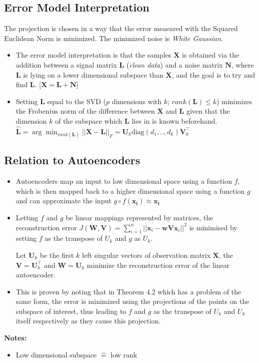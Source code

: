 \documentclass[english]{latex4ei/latex4ei_sheet}
\begin{document}
\begin{sectionbox}
\subsection{Error Model Interpretation}
The projection is chosen in a way that the error measured with the Squared Euclidean Norm is minimized. The minimized noise is \emph{White Gaussian}.
\begin{itemize}
\item The error model interpretation is that the samples $\mathbf{X}$ is obtained via the addition between a signal matrix $\mathbf{L}$ (\emph{clean data}) and a noise matrix $\mathbf{N}$, where $\mathbf{L}$ is lying on a lower dimensional subspace than $\mathbf{X}$, and the goal is to try and find $\mathbf{L}$.
[$\mathbf{X}=\mathbf{L}+\mathbf{N}$]
\item Setting $\mathbf{L}$ equal to the SVD ($p$ dimensions with $k$; $rank(\mathbf{L})\le k$) minimizes the Frobenius norm of the difference between $\mathbf{X}$ and $\mathbf{L}$ given that the dimension $k$ of the subspace which $\mathbf{L}$ lies in is known beforehand. \\
$ \hat{\mathbf{L}}=\arg\min_{rank(\mathbf{L})}||\mathbf{X}-\mathbf{L}||_F=\mathbf{U}_k\mathrm{diag}(d_1,..,d_k)\mathbf{V}_k^{\top}$
\end{itemize}

\subsection{Relation to Autoencoders}
\begin{itemize}
    \item Autoencoders map an input to low dimensional space using a function $f$, which is then mapped back to a higher dimensional space using a function $g$ and can approximate the input $g\circ f(\mathbf{x_i})\approx\mathbf{x_i}$
\item Letting $f$ and $g$ be linear mappings represented by matrices, the reconstruction error $J(\mathbf{W,V})=\sum_{i=1}^n||\mathbf{x}_i-\mathbf{wVx}_i||^2$ is minimised by setting $f$ as the transpose of $U_k$ and $g$ as $U_k$.
\begin{emphbox}
    Let $\mathbf{U}_k$ be the first $k$ left singular vectors of observation matrix $\mathbf{X}$, the $\mathbf{V}=\mathbf{U}_k^{\top}$ and $\mathbf{W}=\mathbf{U}_k$ minimize the reconstruction error of the linear autoencoder.
\end{emphbox}
\item This is proven by noting that in Theorem 4.2 which has a problem of the same form, the error is minimized using the projections of the points on the subspace of interest, thus leading to $f$ and $g$ as the transpose of $U_k$ and $U_k$ itself respectively as they cause this projection.

\end{itemize}
\end{sectionbox}
\textbf{Notes:}
\begin{itemize}
    \item Low dimensional subspace $\hat{=}$ low rank
\end{itemize}
\end{document}
